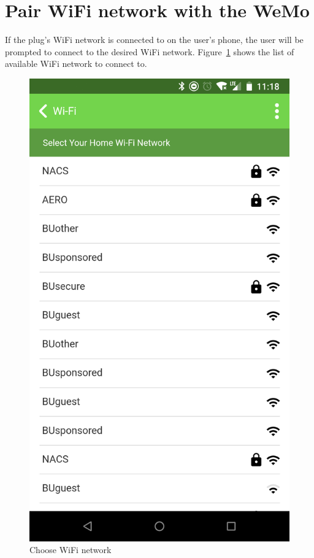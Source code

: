 \section{Pair WiFi network with the WeMo}
If the plug's WiFi network is connected to on the user's phone, the user will be prompted to connect to the desired WiFi network. Figure~\ref{fig:chooseNetwork} shows the list of available WiFi network to connect to.
\begin{figure}[H]
\centering
\includegraphics[scale=0.09]{figs/wemoApp/chooseNetworkWemo.png}
\caption{Choose WiFi network}
\label{fig:chooseNetwork}
\end{figure}

